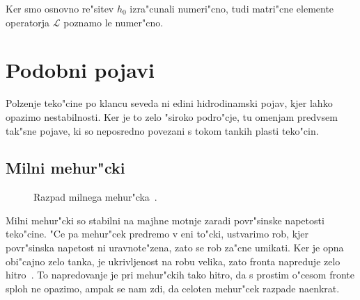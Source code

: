 \documentclass[a4paper,10pt]{article}
\begin{document}
Ker smo osnovno re"sitev $h_0$ izra"cunali numeri"cno, tudi matri"cne elemente operatorja $\mathcal{L}$ poznamo le numer"cno. 

\section{Podobni pojavi}

Polzenje teko"cine po klancu seveda ni edini hidrodinamski pojav, kjer lahko opazimo nestabilnosti. Ker je to zelo "siroko podro"cje, tu omenjam predvsem tak"sne pojave, ki so neposredno povezani s tokom tankih plasti teko"cin. 

\subsection{Milni mehur"cki}

\begin{figure}[h]
 \centering
{}
\caption{Razpad milnega mehur"cka~\cite{slike-mehurcek}. }
\label{fig:mehurcek-3}
\end{figure}

Milni mehur"cki so stabilni na majhne motnje zaradi povr"sinske napetosti teko"cine. "Ce pa mehur"cek predremo v eni to"cki, ustvarimo rob, kjer povr"sinska napetost ni uravnote"zena, zato se rob za"cne umikati. Ker je opna obi"cajno zelo tanka, je ukrivljenost na robu velika, zato fronta napreduje zelo hitro~\cite{diploma}. To napredovanje je pri mehur"ckih tako hitro, da s prostim o"cesom fronte sploh ne opazimo, ampak se nam zdi, da celoten mehur"cek razpade naenkrat. 
\end{document}
